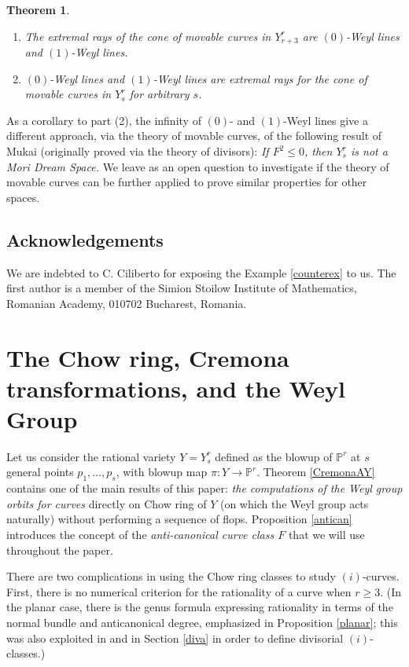 \documentclass[12pt]{article}
\newtheorem{theorem}[equation]{Theorem}
\numberwithin{equation}{section}
\numberwithin{subeq}{equation}
\def\bbP{\mathbb{P}}
\begin{document}
\begin{theorem}\label{extremal rays}
\begin{enumerate}
\item The extremal rays of the cone of movable curves in $Y^r_{r+3}$  are $(0)$-Weyl lines and $(1)$-Weyl lines.
\item $(0)$-Weyl lines and $(1)$-Weyl lines are extremal rays for the cone of movable curves in $Y^r_{s}$ for arbitrary $s$.
\end{enumerate}
\end{theorem}

As a corollary to part (2), the infinity of $(0)$- and $(1)$-Weyl lines give a different approach,
via the theory of movable curves,
 of the following result of Mukai (originally proved via the theory of divisors):
 \emph{If $F^2\leq 0$, then $Y^r_s$ is not a Mori Dream Space.}
 We leave as an open question to investigate if the theory of movable curves can be further applied to prove similar properties for other spaces.

\subsection*{Acknowledgements} 
We are indebted to C. Ciliberto for exposing the Example \ref{counterex} to us. The first author is a member of the Simion Stoilow Institute of Mathematics, Romanian Academy, 010702 Bucharest, Romania.


\section{The Chow ring, Cremona transformations, and the Weyl Group}\label{ChowRingY}
Let us consider the rational variety $Y=Y_s^r$
defined as the blowup of $\bbP^r$ at $s$ general points $p_1,\ldots,p_s$,
with blowup map $\pi:Y \to \bbP^r$.
Theorem \ref{CremonaAY}  contains
one of the main results of this paper:
\emph{the computations of the Weyl group orbits
for curves} directly on Chow ring of $Y$
(on which the Weyl group acts naturally)
without performing a sequence of flops.
Proposition \ref{antican} introduces the concept of the \emph{anti-canonical curve class $F$} that we will use throughout the paper.

There are two complications in using the Chow ring classes to study $(i)$-curves.
First, there is no numerical criterion for the rationality of a curve when $r \geq 3$.
(In the planar case, there is the genus formula 
expressing rationality in terms of the normal bundle and anticanonical degree,
emphasized in Proposition \ref{planar};
this was also exploited in \cite{DP} and in Section \ref{diva} in order 
to define divisorial $(i)$-classes.)
\end{document}
